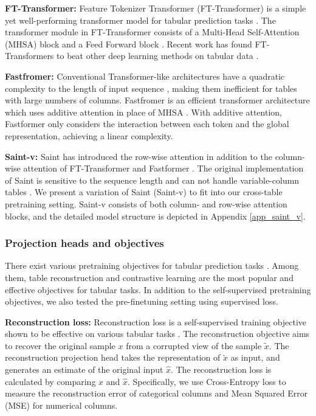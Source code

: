 \textbf{FT-Transformer:} Feature Tokenizer Transformer (FT-Transformer) is a simple yet well-performing transformer model for tabular prediction tasks \citep{gorishniy2021revisiting}. The transformer module in FT-Transformer consists of a Multi-Head Self-Attention (MHSA) block and a Feed Forward block \citep{vaswani2017attention}. Recent work has found FT-Transformers to beat other deep learning methods on tabular data \citep{grinsztajn2022tree}.

\textbf{Fastfromer:} Conventional Transformer-like architectures have a quadratic complexity to the length of input sequence \citep{vaswani2017attention}, making them inefficient for tables with large numbers of columns. Fastfromer is an efficient transformer architecture which uses additive attention in place of MHSA \citep{wu2021fastformer}. With additive attention, Fastformer only considers the interaction between each token and the global representation, achieving a linear complexity. 

\textbf{Saint-v:} Saint has introduced the row-wise attention in addition to the column-wise attention of FT-Transformer and Fastformer \citep{somepalli2021saint}. The original implementation of Saint is sensitive to the sequence length and can not handle variable-column tables \citep{somepalli2021saint}. We present a variation of Saint (Saint-v) to fit into our cross-table pretraining setting. Saint-v consists of both column- and row-wise attention blocks, and the detailed model structure is depicted in Appendix \ref{app_saint_v}. 

\subsubsection{Projection heads and objectives} \label{obj} 
There exist various pretraining objectives for tabular prediction tasks \citep{rubachev2022revisiting, majmundar2022met, bahri2021scarf, ucar2021subtab, wang2022transtab, yoon2020vime}. Among them, table reconstruction and contrastive learning are the most popular and effective objectives for tabular tasks. In addition to the self-supervised pretraining objectives, we also tested the pre-finetuning setting using supervised loss.

\textbf{Reconstruction loss:} Reconstruction loss is a self-supervised training objective shown to be effective on various tabular tasks \citep{rubachev2022revisiting, majmundar2022met}. The reconstruction objective aims to recover the original sample $x$ from a corrupted view of the sample $\tilde{x}$. The reconstruction projection head takes the representation of $\tilde{x}$ as input, and generates an estimate of the original input $\hat{x}$. The reconstruction loss is calculated by comparing $x$ and $\hat{x}$. Specifically, we use Cross-Entropy loss to measure the reconstruction error of categorical columns and Mean Squared Error (MSE) for numerical columns.

